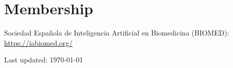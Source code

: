 \documentclass[11pt,fullpage]{article}
\renewenvironment{itemize}{
  \begin{list}{}{
    \setlength{\leftmargin}{1.5em}
  }
}{
  \end{list}
}
\begin{document}
\section*{Membership}

\begin{itemize}
  \item Sociedad Española de Inteligencia Artificial en Biomedicina (BIOMED): \href{https://iabiomed.org/}{https://iabiomed.org/}
\end{itemize}

\bigskip
\begin{center}
  \begin{footnotesize}
    Last updated: \today
  \end{footnotesize}
\end{center}

\end{document}
